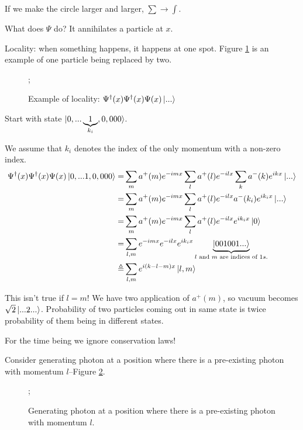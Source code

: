 \documentclass[]{article}
\begin{document}
If we make the circle larger and larger, $\sum \rightarrow \int$.

What does $\Psi$ do? It annihilates a particle at $x$.

Locality: when something happens, it happens at one spot. Figure \ref{fig:ex:locality} is an example of one particle being replaced by two.

\begin{figure}[H]
	\caption[Example of locality: one particle is replaced by two]{Example of locality: $\Psi^\dagger(x)\Psi^\dagger(x)\Psi(x)\ket{...}$}\label{fig:ex:locality}
	\begin{center}
		;
	\end{center}
\end{figure}



Start with state $\ket{0,...\underbrace{1}_\text{$k_i$},0,000}$.

We assume that $k_i$ denotes the index of the only momentum with a non-zero index.
\begin{align*}
\Psi^\dagger(x)\Psi^\dagger(x)\Psi(x)\ket{0,...1,0,000}=&\sum_m a^+(m) e^{-imx} \sum_l a^+(l) e^{-ilx} \sum_k a^-(k) e^{ikx} \ket{...}\\
=&\sum_m a^+(m) e^{-imx} \sum_l a^+(l) e^{-ilx} a^-(k_i) e^{ik_ix} \ket{...}\\
=&\sum_m a^+(m) e^{-imx} \sum_l a^+(l) e^{-ilx}  e^{ik_ix} \ket{0}\\
=&\sum_{l,m}  e^{-imx}  e^{-ilx}  e^{ik_ix} \underbrace{\ket{001001...}}_\text{$l$ and $m$ are indices of $1s$.}\\
\triangleq &\sum_{l,m}   e^{i(k-l-m)x} \ket{l,m}
\end{align*}

This isn't true if $l=m$! We have two application of $a^+(m)$, so vacuum becomes $\sqrt{2}\ket{...2...}$. Probability of two particles coming out in same state is twice probability of them being in different states.

For the time being we ignore conservation laws!

Consider generating photon at a position where there is a pre-existing photon with momentum $l$--Figure \ref{fig:simple:decay}.
\begin{figure}[H]
	\begin{center}
		\caption[Generating photon  where there is a pre-existing photon]{Generating photon at a position where there is a pre-existing photon with momentum $l$.}\label{fig:simple:decay}
		;
	\end{center}
\end{figure}
\end{document}
